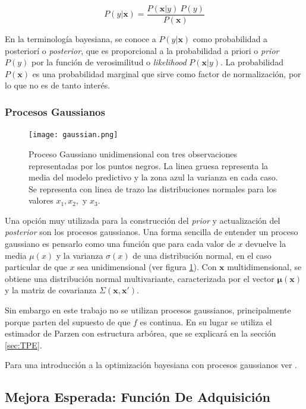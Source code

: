  \[
 P(y|\textbf{x}) = \frac{P(\textbf{x}|y) \ P(y)}{P(\textbf{x})}
 \]
 
En la terminología bayesiana, se conoce a $P(y|\textbf{x})$ como probabilidad a posteriorí o \textit{posterior}, que es proporcional a la probabilidad a priori o \textit{prior} $P(y)$ por la función de verosimilitud o \textit{likelihood} $P(\textbf{x}|y)$. La probabilidad $P(\textbf{x})$ es una probabilidad marginal que sirve como factor de normalización, por lo que no es de tanto interés.


\subsubsection*{Procesos Gaussianos}

\begin{figure}[h!]
\centering
\texttt{[image: gaussian.png]}
\caption{Proceso Gaussiano unidimensional con tres observaciones representadas por los puntos negros. La linea gruesa representa la media del modelo predictivo y la zona azul la varianza en cada caso. Se representa con linea de trazo las distribuciones normales para los valores $x_1, x_2,$ y $x_3$\cite{https://doi.org/10.48550/arxiv.1012.2599}.}
\label{fig:gaussian}
\end{figure}

Una opción muy utilizada para la construcción del \textit{prior} y actualización del \textit{posterior} son los procesos gaussianos. Una forma sencilla de entender un proceso gaussiano es pensarlo como una función que para cada valor de $x$ devuelve la media $\mu(x)$ y la varianza $\sigma(x)$ de una distribución normal, en el caso particular de que $x$ sea unidimensional (ver figura \ref{fig:gaussian}). Con $\textbf{x}$ multidimensional, se obtiene una distribución normal multivariante, caracterizada por el vector $\bm{\mu}(\textbf{x})$ y la matriz de covarianza $\Sigma(\textbf{x}, \textbf{x}')$.

Sin embargo en este trabajo no se utilizan procesos gaussianos, principalmente porque parten del supuesto de que $f$ es continua. En su lugar se utiliza el estimador de Parzen con estructura arbórea, que se explicará en la sección \ref{sec:TPE}.

Para una introducción a la optimización bayesiana con procesos gaussianos ver \cite{https://doi.org/10.48550/arxiv.1012.2599}.

\subsection{Mejora Esperada: Función De Adquisición} 
 
